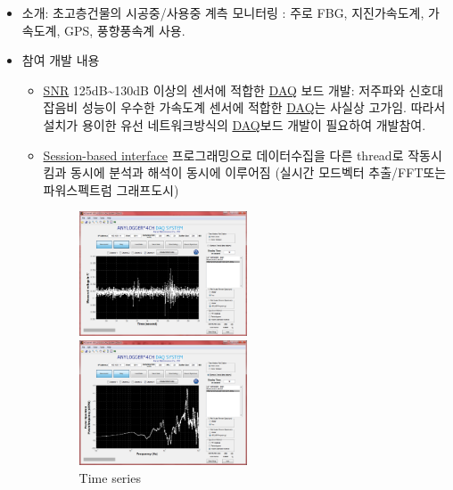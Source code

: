 \documentclass[10pt,a4paper,ragged2e]{altacv}
\begin{document}
\begin{fullwidth}
\divider


\begin{itemize}
\item 소개: 초고층건물의 시공중/사용중 계측 모니터링 : 주로 FBG, 지진가속도계, 가속도계, GPS, 풍향풍속계 사용.
\item 참여 개발 내용
  \begin{itemize}
    \item \href{https://en.wikipedia.org/wiki/Signal-to-noise_ratio}{SNR} 125dB\textasciitilde{}130dB 이상의 센서에 적합한 \href{https://en.wikipedia.org/wiki/Data_acquisition}{DAQ} 보드 개발: 저주파와 신호대잡음비 성능이 우수한 가속도계 센서에 적합한 \href{https://en.wikipedia.org/wiki/Data_acquisition}{DAQ}는 사실상 고가임. 따라서 설치가 용이한 유선 네트워크방식의 \href{https://en.wikipedia.org/wiki/Data_acquisition}{DAQ}보드 개발이 필요하여 개발참여.
    \item \href{http://kr.mathworks.com/help/daq/examples/getting-started-with-session-based-interface-using-ni-devices.html}{Session-based interface} 프로그래밍으로 데이터수집을 다른 thread로 작동시킴과 동시에 분석과 해석이 동시에 이루어짐 (실시간 모드벡터 추출/FFT또는 파워스펙트럼 그래프도시)
    \begin{figure}[ht]
      \begin{fullwidth}
        \parbox{0.5\textwidth}{
          \includegraphics[width=0.5\textwidth] {images/SW1.JPG}
          \caption*{Time series}
        }\qquad
        \parbox{0.5\textwidth}{
          \includegraphics[width=0.5\textwidth] {images/SW2.JPG}
}
\end{fullwidth}
\end{figure}
\end{itemize}
\end{itemize}
\end{fullwidth}
\end{document}
